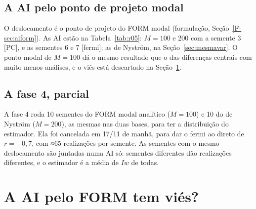 \documentclass[11pt,a4paper]{article}
\begin{document}
\subsection{A AI pelo ponto de projeto modal}\label{sec:aimodal}
O deslocamento é o ponto de projeto do FORM modal (formulação, Seção~\ref{F-sec:aiform}). As AI estão na
Tabela~\ref{tab:r05}: $M = 100$ e 200 com a semente 3 [PC], e as sementes 6 e 7 [fermi]; as de Nyström, na
Seção~\ref{sec:mesmavar}. O ponto modal de $M = 100$ dá o mesmo resultado que o das diferenças centrais com muito menos
análises, e o viés está descartado na Seção~\ref{sec:vies}.

\subsection{A fase 4, parcial}\label{sec:fase4}
A fase 4 roda 10 sementes do FORM modal analítico ($M = 100$) e 10 do de Nyström ($M = 200$), as mesmas nas duas bases,
para ter a distribuição do estimador. Ela foi cancelada em 17/11 de manhã, para dar o fermi ao direto de $r = -0{,}7$, com
≈65 realizações por semente. As sementes com o mesmo deslocamento são juntadas numa AI só: sementes diferentes dão
realizações diferentes, e o estimador é a média de $I w$ de todas.
\begin{table}[H]\centering\small
{}
\caption{A fase 4 até o cancelamento. A dif. é contra o direto de $r = -0{,}5$; nas de Nyström, ela é aproximada
(Seção~\ref{sec:mesmavar}).}\label{tab:fase4}
\end{table}


\section{A AI pelo FORM tem viés?}\label{sec:vies}
\end{document}
